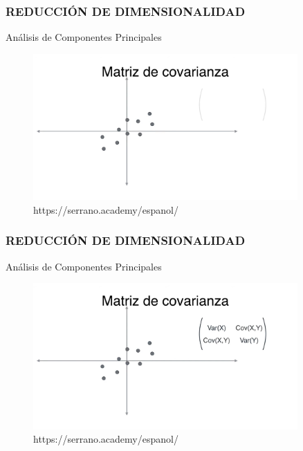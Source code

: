 \documentclass{beamer}
\begin{document}
\begin{frame}
\frametitle{REDUCCIÓN DE DIMENSIONALIDAD}
\begin{block}{Análisis de Componentes Principales}	
	\begin{figure}
		\includegraphics[width=0.9\textwidth]{PCA/IMG_3565.jpg}
		\caption{https://serrano.academy/espanol/}
	\end{figure}
\end{block}
\end{frame}


\begin{frame}
\frametitle{REDUCCIÓN DE DIMENSIONALIDAD}
\begin{block}{Análisis de Componentes Principales}	
	\begin{figure}
		\includegraphics[width=0.9\textwidth]{PCA/IMG_3566.jpg}
		\caption{https://serrano.academy/espanol/}
	\end{figure}
\end{block}
\end{frame}
\end{document}
